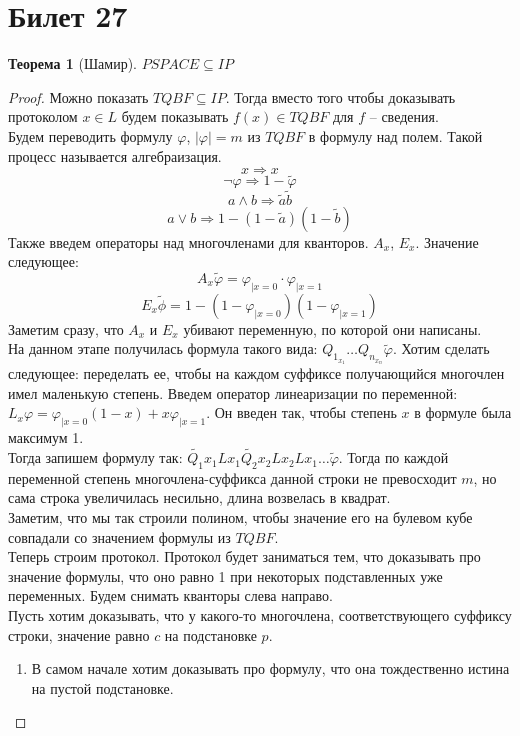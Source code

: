 \documentclass[12pt, letterpaper]{article}
\newtheorem{theorem}{Теорема}[section]
\newcommand{\ph}{\varphi}
\begin{document}
\section{Билет 27}
\begin{theorem}[Шамир]
$PSPACE \subseteq IP$
\end{theorem}
\begin{proof}
Можно показать $TQBF \subseteq IP$. Тогда вместо того чтобы доказывать протоколом $x \in L$ будем показывать $f(x) \in TQBF$ для $f$ -- сведения.\\
Будем переводить формулу $\ph$, $|\ph|=m$ из $TQBF$ в формулу над полем. Такой процесс называется алгебраизация.
$$ x \Longrightarrow x $$
$$ \neg \ph \Longrightarrow 1 - \widetilde{\ph} $$
$$ a \wedge b \Longrightarrow \widetilde{a}\widetilde{b} $$
$$ a \vee b \Longrightarrow 1 - (1 - \widetilde{a})(1 - \widetilde{b}) $$ 
Также введем операторы над многочленами для кванторов. $A_x$, $E_x$. Значение следующее:
$$A_x \widetilde{\ph} = \ph_{|x=0} \cdot \ph_{|x=1}$$
$$E_x \widetilde{\phi} = 1 - (1 - \ph_{|x=0})(1 - \ph_{|x=1})$$
Заметим сразу, что $A_x$ и $E_x$ убивают переменную, по которой они написаны. \\
На данном этапе получилась формула такого вида: $Q_{1_{x_1}} \ldots Q_{n_{x_n}} \widetilde{\ph}$. Хотим сделать следующее: переделать ее, чтобы на каждом суффиксе получающийся многочлен имел маленькую степень. Введем оператор линеаризации по переменной:
$L_x \ph = \ph_{|x=0}(1-x) + x\ph_{|x=1}$. Он введен так, чтобы степень $x$ в формуле была максимум 1.\\
Тогда запишем формулу так: $\widetilde{Q_1} x_1 L x_1 \widetilde{Q_2} x_2 L x_2 L x_1 \ldots \widetilde{\ph}$. Тогда по каждой переменной степень многочлена-суффикса данной строки не превосходит $m$, но сама строка увеличилась несильно, длина возвелась в квадрат.\\
Заметим, что мы так строили полином, чтобы значение его на булевом кубе совпадали со значением формулы из $TQBF$. \\
Теперь строим протокол. Протокол будет заниматься тем, что доказывать про значение формулы, что оно равно 1 при некоторых подставленных уже переменных. Будем снимать кванторы слева направо.\\
Пусть хотим доказывать, что у какого-то многочлена, соответствующего суффиксу строки, значение равно $c$ на подстановке $p$. 
\begin{enumerate}
\item В самом начале хотим доказывать про формулу, что она тождественно истина на пустой подстановке. 

\end{enumerate}
\end{proof}
\end{document}
